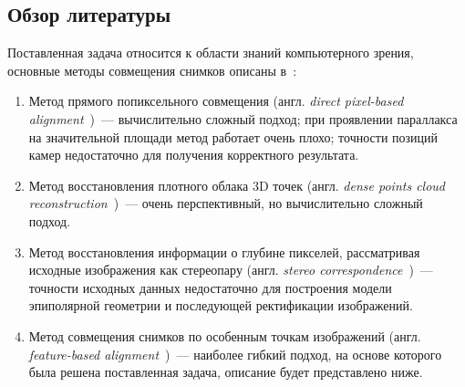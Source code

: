 \documentclass[a4paper,12pt]{article}
\begin{document}
\subsection{Обзор литературы}
Поставленная задача относится к области знаний компьютерного зрения, 
основные методы совмещения снимков описаны 
в~\cite{zitova03is-survey, szelisky06alignstichtut, szelisky10compvis}:
\begin{enumerate}
  \item Метод прямого попиксельного совмещения (англ. 
  \emph{direct pixel-based alignment}~\cite{bergen92hmbme})~--- 
  вычислительно сложный подход; 
  при проявлении параллакса на значительной площади метод работает очень плохо;
  точности позиций камер недостаточно для получения корректного
  результата.
  \item Метод восстановления плотного облака 3D точек (англ. 
  \emph{dense points cloud reconstruction}~\cite{furu09mvs})~--- очень перспективный, 
  но вычислительно сложный подход.
  \item Метод восстановления информации о глубине пикселей, рассматривая исходные
  изображения как стереопару (англ. 
  \emph{stereo correspondence}~\cite{scharstein02taxonomy})~--- 
  точности исходных данных недостаточно для построения модели эпиполярной 
  геометрии и последующей ректификации изображений.
  \item Метод совмещения снимков по особенным точкам изображений (англ. 
  \emph{feature-based alignment}~\cite{cham98matchframework, brown03recognising, mclauchlan02mosaic})~--- 
  наиболее гибкий подход, на основе которого была решена поставленная задача, 
  описание будет представлено ниже.
\end{enumerate}


\end{document}
